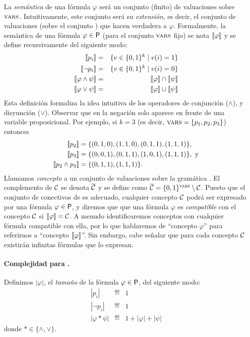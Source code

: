 La {\em semántica} de una fórmula $\varphi$ será un conjunto (finito) de valuaciones sobre $\textsc{vars}$. Intuitivamente, este conjunto será su {\em extensión}, es decir, el conjunto de valuaciones (sobre el conjunto \propvars) que hacen verdadera a $\varphi$. 
%
Formalmente, la semántica de una fórmula $\varphi\in{\sf P}$ (para el conjunto $\textsc{vars}$ fijo) se nota $\llbracket \varphi\rrbracket$  y se define recursivamente del siguiente modo:
%
\begin{eqnarray*}
\llbracket p_i\rrbracket &=& \{ v\in\{0,1\}^k \mid v(i)=1\}\\
\llbracket \lnot p_i\rrbracket &=& \{ v\in\{0,1\}^k \mid v(i)=0\}\\
\llbracket \varphi\wedge\psi\rrbracket &=& \llbracket \varphi\rrbracket\cap\llbracket \psi\rrbracket\\
\llbracket \varphi\vee\psi\rrbracket &=& \llbracket \varphi\rrbracket\cup\llbracket \psi\rrbracket
\end{eqnarray*}
%
Esta definición formaliza la idea intuitiva de los operadores de conjunción ($\wedge$), y disyunción ($\vee$). Observar que en \grambool la negación solo aparece en frente de una variable proposicional. Por ejemplo, si $k=3$ (es decir, $\textsc{vars}=\{p_1,p_2,p_3\}$) entonces 
\begin{align*}
\llbracket p_2\rrbracket&=\{(0,1,0), (1,1,0), (0,1,1), (1,1,1)\},\\
\llbracket p_3\rrbracket&=\{(0,0,1), (0,1,1), (1,0,1), (1,1,1)\}, \textrm{ y}\\
\llbracket p_2\wedge p_3\rrbracket&=\{(0,1,1), (1,1,1)\}.
\end{align*}
Llamamos {\em concepto} a un conjunto de valuaciones sobre la gramática \grambool. El complemento de $\mathcal{C}$ se denota $\overline {\mathcal{C}}$ y se define como $\overline {\mathcal{C}}=\{0,1\}^{\textsc{vars}}\setminus \mathcal{C}$. Puesto que el conjunto de conectivos de \grambool es adecuado, cualquier concepto $\mathcal{C}$ podrá ser expresado por una fórmula $\varphi\in{\sf P}$, y diremos que que una fórmula $\varphi$ es {\em compatible} con el concepto $\mathcal{C}$ si $\llbracket \varphi\rrbracket=\mathcal{C}$. A menudo identificaremos conceptos con cualquier fórmula compatible con ella, por lo que hablaremos de ``concepto $\varphi$'' para referirnos a ``concepto $\llbracket \varphi\rrbracket$''. Sin embargo, cabe señalar que para cada concepto $\mathcal{C}$ existirán infinitas fórmulas que lo expresan.

\paragraph{Complejidad para \grambool.} Definimos $|\varphi|$, el {\em tamaño} de la fórmula $\varphi\in{\sf P}$, del siguiente modo:
\begin{eqnarray*}
|p_i| &\eqdef& 1\\
|\lnot p_i| &\eqdef& 1\\
|\varphi*\psi| &\eqdef& 1+|\varphi|+|\psi|
\end{eqnarray*}
donde $*\in\{\wedge,\vee\}$.

